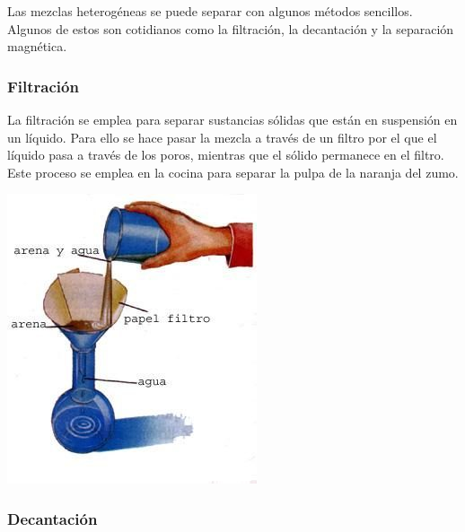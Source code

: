 Las mezclas heterogéneas se puede separar con algunos métodos sencillos. Algunos de estos son cotidianos como la filtración, la decantación y la separación magnética.

\subsubsection*{Filtración}

La filtración se emplea para separar sustancias sólidas que están en suspensión en un líquido. Para ello se hace pasar la mezcla a través de un filtro por el que el líquido pasa a través de los poros, mientras que el sólido permanece en el filtro. Este proceso se emplea en la cocina para separar la pulpa de la naranja del zumo.
\begin{center}
\includegraphics[scale=0.8]{imagenes/filtracion} 
\end{center}



\subsubsection*{Decantación}

